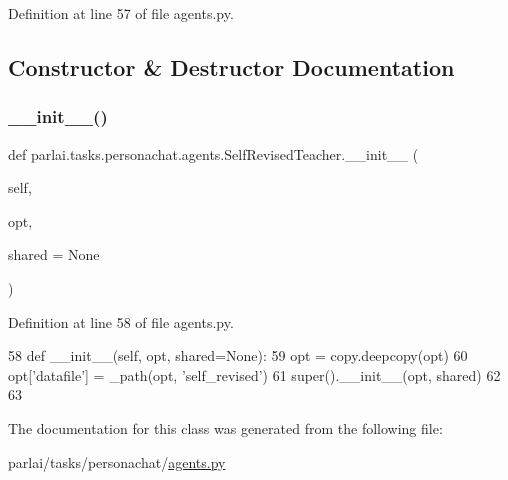 Definition at line 57 of file agents.\+py.



\subsection{Constructor \& Destructor Documentation}
\mbox{\label{classparlai_1_1tasks_1_1personachat_1_1agents_1_1SelfRevisedTeacher_a7d6545ffc585ee5edc99b2ce5a117aeb}} 
\subsubsection{\texorpdfstring{\+\_\+\+\_\+init\+\_\+\+\_\+()}{\_\_init\_\_()}}
{\footnotesize\ttfamily def parlai.\+tasks.\+personachat.\+agents.\+Self\+Revised\+Teacher.\+\_\+\+\_\+init\+\_\+\+\_\+ (\begin{DoxyParamCaption}\item[{}]{self,  }\item[{}]{opt,  }\item[{}]{shared = {\ttfamily None} }\end{DoxyParamCaption})}



Definition at line 58 of file agents.\+py.


\begin{DoxyCode}
58     \textcolor{keyword}{def }\_\_init\_\_(self, opt, shared=None):
59         opt = copy.deepcopy(opt)
60         opt[\textcolor{stringliteral}{'datafile'}] = \_path(opt, \textcolor{stringliteral}{'self\_revised'})
61         super().\_\_init\_\_(opt, shared)
62 
63 
\end{DoxyCode}


The documentation for this class was generated from the following file\+:\begin{DoxyCompactItemize}
\item 
parlai/tasks/personachat/\hyperlink{parlai_2tasks_2personachat_2agents_8py}{agents.\+py}\end{DoxyCompactItemize}
